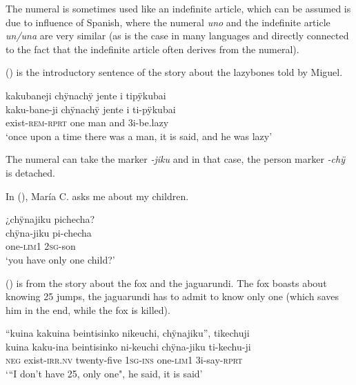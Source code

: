 The numeral is sometimes used like an indefinite article, which can be assumed is due to influence of Spanish, where the numeral \textit{uno} and the indefinite article \textit{un/una} are very similar (as is the case in many languages and directly connected to the fact that the indefinite article often derives from the numeral).

() is the introductory sentence of the story about the lazybones told by Miguel.

\ea\label{ex:one-4}
\begingl
\glpreamble kakubaneji chÿnachÿ jente i tipÿkubai\\
\gla kaku-bane-ji chÿnachÿ jente i ti-pÿkubai\\
\glb exist-\textsc{rem}-\textsc{rprt} one man and 3i-be.lazy\\
\glft ‘once upon a time there was a man, it is said, and he was lazy’
\endgl
\trailingcitation{[mox-n110920l.011]}
\xe

The numeral can take the  marker \textit{-jiku} and in that case, the person marker \textit{-chÿ} is detached.

In (), María C. asks me about my children.%


\ea\label{ex:one-5}
\begingl
\glpreamble ¿chÿnajiku pichecha?\\
\gla chÿna-jiku pi-checha\\
\glb one-\textsc{lim}1 2\textsc{sg}-son\\
\glft ‘you have only one child?’
\endgl
\trailingcitation{[uxx-p110825l.242]}
\xe

() is from the story about the fox and the jaguarundi. The fox boasts about knowing 25 jumps, the jaguarundi has to admit to know only one (which saves him in the end, while the fox is killed).

\ea\label{ex:one-6}
\begingl
\glpreamble “kuina kakuina beintisinko nikeuchi, chÿnajiku”, tikechuji\\
\gla kuina kaku-ina beintisinko ni-keuchi chÿna-jiku ti-kechu-ji\\
\glb \textsc{neg} exist-\textsc{irr.nv} twenty-five 1\textsc{sg}-\textsc{ins} one-\textsc{lim}1 3i-say-\textsc{rprt}\\
\glft ‘“I don’t have 25, only one", he said, it is said’
\endgl
\trailingcitation{[jmx-n120429ls-x5.363]}
\xe

